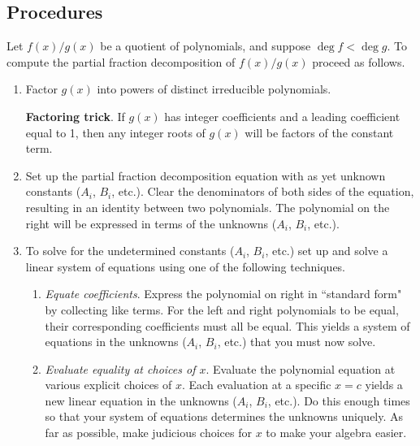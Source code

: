 \subsection*{Procedures}
\begin{namedtheorem}
  Let $f(x)/g(x)$ be a quotient of polynomials, and suppose $\deg f<\deg g$. To compute the partial fraction decomposition of $f(x)/g(x)$ proceed as follows.
  \begin{enumerate}
    \item Factor $g(x)$ into powers of distinct irreducible polynomials.

    {\bf Factoring trick}. If $g(x)$ has integer coefficients and a leading coefficient equal to 1, then any integer roots of $g(x)$ will be factors of the constant term.
    \item Set up the partial fraction decomposition equation with as yet unknown constants ($A_i$, $B_i$, etc.). Clear the denominators of both sides of the equation, resulting in an identity between two polynomials. The polynomial on the right will be expressed in terms of the unknowns ($A_i$, $B_i$, etc.).
    \item To solve for the undetermined constants ($A_i$, $B_i$, etc.) set up and solve a linear system of equations using one of the following techniques.
    \begin{enumerate}
      \item {\em Equate coefficients}. Express the polynomial on right in ``standard form" by collecting like terms. For the left and right polynomials to be equal, their corresponding coefficients must all be equal. This yields a system of equations in the unknowns ($A_i$, $B_i$, etc.) that you must now solve.
      \item {\em Evaluate equality at choices of $x$}. Evaluate the polynomial equation at various explicit choices of $x$. Each evaluation at a specific $x=c$ yields a new linear equation in the unknowns ($A_i$, $B_i$, etc.). Do this enough times so that your system of equations determines the unknowns uniquely. As far as possible, make judicious choices for $x$ to make your algebra easier.
    \end{enumerate}
  \end{enumerate}

\end{namedtheorem}

